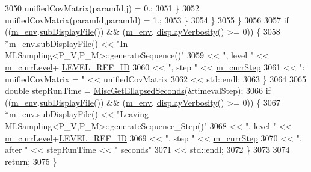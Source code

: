 \begin{DoxyCode}
3050               unifiedCovMatrix(paramId,j) = 0.;
3051             \}
3052             unifiedCovMatrix(paramId,paramId) = 1.;
3053           \}
3054         \}
3055       \}
3056 
3057       \textcolor{keywordflow}{if} ((\hyperlink{class_q_u_e_s_o_1_1_m_l_sampling_a13f1ca4fe9f94822fe572a743eaced1d}{m\_env}.\hyperlink{class_q_u_e_s_o_1_1_base_environment_a8a0064746ae8dddfece4229b9ad374d6}{subDisplayFile}()) && (\hyperlink{class_q_u_e_s_o_1_1_m_l_sampling_a13f1ca4fe9f94822fe572a743eaced1d}{m\_env}.
      \hyperlink{class_q_u_e_s_o_1_1_base_environment_a1fe5f244fc0316a0ab3e37463f108b96}{displayVerbosity}() >= 0)) \{
3058         *\hyperlink{class_q_u_e_s_o_1_1_m_l_sampling_a13f1ca4fe9f94822fe572a743eaced1d}{m\_env}.\hyperlink{class_q_u_e_s_o_1_1_base_environment_a8a0064746ae8dddfece4229b9ad374d6}{subDisplayFile}() << \textcolor{stringliteral}{"In MLSampling<P\_V,P\_M>::generateSequence()"}
3059                                 << \textcolor{stringliteral}{", level "}              << \hyperlink{class_q_u_e_s_o_1_1_m_l_sampling_af9416874c856e50f3b35270e801f17e4}{m\_currLevel}+
      \hyperlink{_m_l_sampling_level_options_8h_a68d15eaf394d210effcf584b938206d3}{LEVEL\_REF\_ID}
3060                                 << \textcolor{stringliteral}{", step "}               << \hyperlink{class_q_u_e_s_o_1_1_m_l_sampling_a1b1f8ccb4823bdfa26ec652f0807c63e}{m\_currStep}
3061                                 << \textcolor{stringliteral}{": unifiedCovMatrix = "} << unifiedCovMatrix
3062                                 << std::endl;
3063       \}
3064 
3065   \textcolor{keywordtype}{double} stepRunTime = \hyperlink{namespace_q_u_e_s_o_a424bc33f2e6e287fd468408d14b772ee}{MiscGetEllapsedSeconds}(&timevalStep);
3066   \textcolor{keywordflow}{if} ((\hyperlink{class_q_u_e_s_o_1_1_m_l_sampling_a13f1ca4fe9f94822fe572a743eaced1d}{m\_env}.\hyperlink{class_q_u_e_s_o_1_1_base_environment_a8a0064746ae8dddfece4229b9ad374d6}{subDisplayFile}()) && (\hyperlink{class_q_u_e_s_o_1_1_m_l_sampling_a13f1ca4fe9f94822fe572a743eaced1d}{m\_env}.
      \hyperlink{class_q_u_e_s_o_1_1_base_environment_a1fe5f244fc0316a0ab3e37463f108b96}{displayVerbosity}() >= 0)) \{
3067     *\hyperlink{class_q_u_e_s_o_1_1_m_l_sampling_a13f1ca4fe9f94822fe572a743eaced1d}{m\_env}.\hyperlink{class_q_u_e_s_o_1_1_base_environment_a8a0064746ae8dddfece4229b9ad374d6}{subDisplayFile}() << \textcolor{stringliteral}{"Leaving MLSampling<P\_V,P\_M>::generateSequence\_Step()"}
3068                             << \textcolor{stringliteral}{", level "} << \hyperlink{class_q_u_e_s_o_1_1_m_l_sampling_af9416874c856e50f3b35270e801f17e4}{m\_currLevel}+\hyperlink{_m_l_sampling_level_options_8h_a68d15eaf394d210effcf584b938206d3}{LEVEL\_REF\_ID}
3069                             << \textcolor{stringliteral}{", step "}  << \hyperlink{class_q_u_e_s_o_1_1_m_l_sampling_a1b1f8ccb4823bdfa26ec652f0807c63e}{m\_currStep}
3070                             << \textcolor{stringliteral}{", after "} << stepRunTime << \textcolor{stringliteral}{" seconds"}
3071                             << std::endl;
3072   \}
3073 
3074   \textcolor{keywordflow}{return};
3075 \}
\end{DoxyCode}
